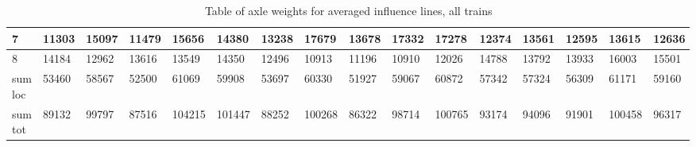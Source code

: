 \begin{sidewaystable}[htpb]
{\begin{tabularx}{\textheight}{ |l|X|X|X|X|X|X|X|X|X|X|X|X|X|X|X| }
      \hline
      7 & 11303   &   15097   &    11479   &    15656   &    14380    &   13238  &     17679    &   13678   &    17332   &    17278   &    12374   &    13561    &   12595   &   13615    &    12636  \\
      \hline
      8 & 14184   &   12962   &    13616   &    13549   &    14350    &   12496  &     10913    &   11196   &    10910   &    12026   &    14788   &    13792    &   13933   &   16003    &    15501  \\
      \hline
      sum loc & 53460   &   58567   &    52500   &    61069   &    59908    &   53697  &     60330    &   51927   &    59067   &    60872   &    57342   &    57324    &   56309   &   61171    &    59160  \\
      \bottomrule
      sum tot & 89132 & 99797 & 87516 & 104215 & 101447 & 88252 & 100268 & 86322 & 98714 & 100765 & 93174 & 94096 & 91901 & 100458 & 96317  \\
      \bottomrule
    \end{tabularx}}
	\caption{Table of axle weights for averaged influence lines, all trains}
	\label{table:all_trains_all sensors}
\end{sidewaystable}

